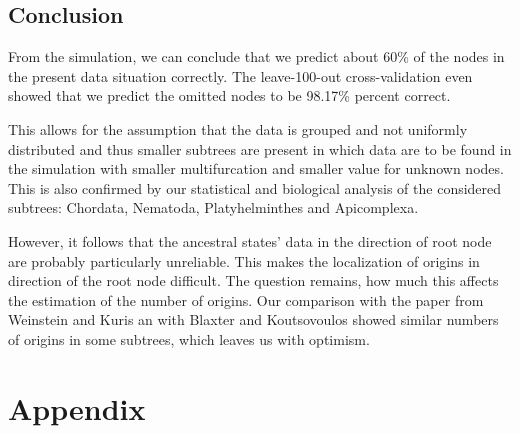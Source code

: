   \section{Conclusion}

    From the simulation, we can conclude that we predict about 60\% of the nodes in the present data 
      situation correctly. The leave-100-out cross-validation even showed that we predict the omitted 
      nodes to be 98.17\% percent correct.

    This allows for the assumption that the data is grouped and not uniformly distributed and thus 
      smaller subtrees are present in which data are to be found in the simulation with smaller 
      multifurcation and smaller value for unknown nodes. This is also confirmed by our statistical 
      and biological analysis of the considered subtrees: Chordata, Nematoda, Platyhelminthes and 
      Apicomplexa.

    However, it follows that the ancestral states' data in the direction of root node are probably 
      particularly unreliable. This makes the localization of origins in direction of the root node 
      difficult. The question remains, how much this affects the estimation of the number of origins. 
      Our comparison with the paper from Weinstein and Kuris \cite{Weinstein2016} an with Blaxter and 
      Koutsovoulos \cite{Blaxter2015} showed similar numbers of origins in some subtrees, which 
      leaves us with optimism.



\chapter{Appendix}
